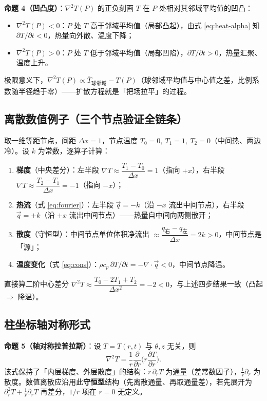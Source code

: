\documentclass[12pt,a4paper]{ctexart}
\begin{document}
\textbf{命题 4（凹凸度）}：$\nabla^2 T(P)$ 的正负刻画 $T$ 在 $P$ 处相对其邻域平均值的凹凸：
\begin{itemize}[leftmargin=2.5em]
\item $\nabla^2 T(P)<0$：$P$ 处 $T$ 高于邻域平均值（局部凸起），由式 \eqref{eq:heat-alpha} 知 $\partial T/\partial t<0$，热量向外散、温度下降；
\item $\nabla^2 T(P)>0$：$P$ 处 $T$ 低于邻域平均值（局部凹陷），$\partial T/\partial t>0$，热量汇聚、温度上升。
\end{itemize}
极限意义下，$\nabla^2 T(P)\propto \overline{T}_{\text{球邻域}}-T(P)$（球邻域平均值与中心值之差，比例系数随半径趋于零）——扩散方程就是「把场拉平」的过程。

\subsection{离散数值例子（三个节点验证全链条）}

取一维等距节点，间距 $\Delta x=1$，节点温度 $T_0=0,\ T_1=1,\ T_2=0$（中间热、两边冷）。设 $k$ 为常数，逐算子计算：

\begin{enumerate}[leftmargin=2.5em]
\item \textbf{梯度}（中央差分）：左半段 $\nabla T\approx\dfrac{T_1-T_0}{\Delta x}=1$（指向 $+x$），右半段 $\nabla T\approx\dfrac{T_2-T_1}{\Delta x}=-1$（指向 $-x$）；
\item \textbf{热流}（式 \eqref{eq:fourier}）：左半段 $\vec{q}=-k$（沿 $-x$ 流出中间节点），右半段 $\vec{q}=+k$（沿 $+x$ 流出中间节点）——热量自中间向两侧散开；
\item \textbf{散度}（守恒型）：中间节点单位体积净流出 $\approx\dfrac{q_{\text{右}}-q_{\text{左}}}{\Delta x}=2k>0$，中间节点是「源」；
\item \textbf{温度变化}（式 \eqref{eq:cons}）：$\rho c_p\,\partial T/\partial t=-\nabla\cdot\vec{q}<0$，中间节点降温。
\end{enumerate}

直接算二阶中心差分 $\nabla^2 T\approx\dfrac{T_0-2T_1+T_2}{\Delta x^2}=-2<0$，与上述四步结果一致（凸起 $\Rightarrow$ 降温）。

\subsection{柱坐标轴对称形式}

\textbf{命题 5（轴对称拉普拉斯）}：设 $T=T(r,t)$ 与 $\theta,z$ 无关，则
\begin{equation}
\nabla^2 T=\frac{1}{r}\frac{\partial}{\partial r}\bigg(r\frac{\partial T}{\partial r}\bigg).
\label{eq:cyl}
\end{equation}
该式保持了「内层梯度、外层散度」的结构：$r\,\partial_r T$ 为通量（差常数因子），$\frac{1}{r}\partial_r$ 为散度。数值离散应沿用此\textbf{守恒型}结构（先离散通量、再取通量差），若先展开为 $\partial_r^2 T+\frac{1}{r}\partial_r T$ 再差分，$1/r$ 项在 $r=0$ 无定义。
\end{document}
